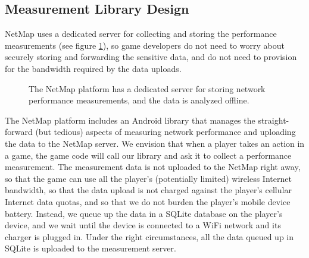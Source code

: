 \subsection{Measurement Library Design}
\label{ss:dataflow}

NetMap uses a dedicated server for collecting and storing the performance
measurements (see figure \ref{fig:servers}), so game developers do not need to
worry about securely storing and forwarding the sensitive data, and do not need
to provision for the bandwidth required by the data uploads.

\begin{figure}[hbtp]
  \caption{
    The NetMap platform has a dedicated server for storing network
    performance measurements, and the data is analyzed offline.
  }
  \label{fig:servers}
\end{figure}

The NetMap platform includes an Android library that manages the
straight-forward (but tedious) aspects of measuring network performance and
uploading the data to the NetMap server. We envision that when a player takes
an action in a game, the game code will call our library and ask it to collect
a performance measurement. The measurement data is not uploaded to the NetMap
right away, so that the game can use all the player's (potentially limited)
wireless Internet bandwidth, so that the data upload is not charged against
the player's cellular Internet data quotas, and so that we do not burden the
player's mobile device battery. Instead, we queue up the data in a SQLite
database on the player's device, and we wait until the device is connected to a
WiFi network and its charger is plugged in. Under the right circumstances, all
the data queued up in SQLite is uploaded to the measurement server.

